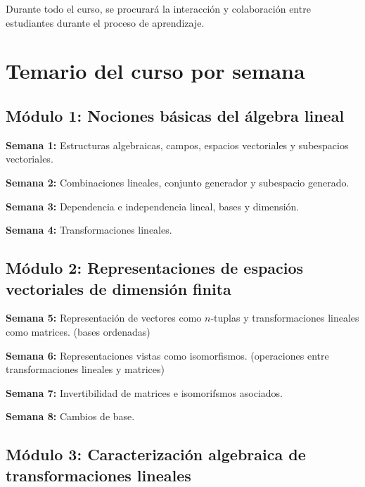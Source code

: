 \vspace{3mm}
Durante todo el curso, se procurará la interacción y colaboración entre estudiantes durante el proceso de aprendizaje.

\section*{Temario del curso por semana}

\subsection*{Módulo 1: Nociones básicas del álgebra lineal} \label{Ssec: Módulo 1: Nociones básicas del álgebra lineal}

\textbf{Semana 1:}  Estructuras algebraicas, campos, espacios vectoriales y subespacios vectoriales.

\vspace{3mm}
\textbf{Semana 2:}  Combinaciones lineales, conjunto generador y subespacio generado.

\vspace{3mm}
\textbf{Semana 3:}  Dependencia e independencia lineal, bases y dimensión.

\vspace{3mm}
\textbf{Semana 4:}  Transformaciones lineales.

\subsection*{Módulo 2: Representaciones de espacios vectoriales de dimensión finita} \label{Ssec: Representaciones de espacios vectoriales de dimensión finita}

\textbf{Semana 5:}  Representación de vectores como $n$-tuplas y transformaciones lineales como matrices. (bases ordenadas)

\vspace{3mm}
\textbf{Semana 6:} Representaciones vistas como isomorfismos. (operaciones entre transformaciones lineales y matrices)

\vspace{3mm}
\textbf{Semana 7:} Invertibilidad de matrices e isomorifsmos asociados.

\vspace{3mm}
\textbf{Semana 8:} Cambios de base.

\subsection*{Módulo 3: Caracterización algebraica de transformaciones lineales} \label{Ssec: Módulo 3: Caracterización algebraica de transformaciones linelaes}

